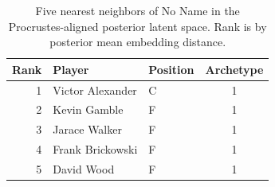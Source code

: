 \begin{table}[htbp]
  \centering\small
  \begin{tabular}{rllc}
    \toprule
    Rank & Player & Position & Archetype \\
    \midrule
    1 & Victor Alexander & C & 1 \\
    2 & Kevin Gamble & F & 1 \\
    3 & Jarace Walker & F & 1 \\
    4 & Frank Brickowski & F & 1 \\
    5 & David Wood & F & 1 \\
    \bottomrule
  \end{tabular}
  \caption{Five nearest neighbors of No Name in the Procrustes-aligned posterior latent space. Rank is by posterior mean embedding distance.}
  \label{tab:No_Name_neighbors}
\end{table}

